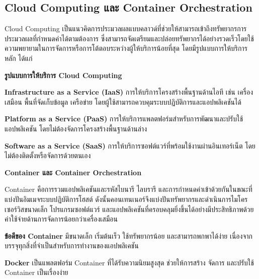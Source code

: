 \subsection{Cloud Computing และ Container Orchestration}

\hspace*{1.5em} %
Cloud Computing เป็นแนวคิดการประมวลผลแบบคลาวด์ที่ช่วยให้สามารถเข้าถึงทรัพยากรการประมวลผลที่กำหนดค่าได้ตามต้องการ ซึ่งสามารถจัดเตรียมและปล่อยทรัพยากรได้อย่างรวดเร็วโดยใช้ความพยายามในการจัดการหรือการโต้ตอบระหว่างผู้ให้บริการน้อยที่สุด โดยมีรูปแบบการให้บริการหลัก ได้แก่

\hspace*{1.5em} %
\textbf{รูปแบบการให้บริการ Cloud Computing}
\begin{mycustomitem}
    \item \textbf{Infrastructure as a Service (IaaS)} การให้บริการโครงสร้างพื้นฐานด้านไอที เช่น เครื่องเสมือน พื้นที่จัดเก็บข้อมูล เครือข่าย โดยผู้ใช้สามารถควบคุมระบบปฏิบัติการและแอปพลิเคชันได้
    \item \textbf{Platform as a Service (PaaS)} การให้บริการแพลตฟอร์มสำหรับการพัฒนาและปรับใช้แอปพลิเคชัน โดยไม่ต้องจัดการโครงสร้างพื้นฐานด้านล่าง
    \item \textbf{Software as a Service (SaaS)} การให้บริการซอฟต์แวร์ที่พร้อมใช้งานผ่านอินเทอร์เน็ต โดยไม่ต้องติดตั้งหรือจัดการด้วยตนเอง
\end{mycustomitem}

\hspace*{1.5em} %
\textbf{Container และ Container Orchestration}

\hspace*{1.5em} %
Container คือการรวมแอปพลิเคชันและรหัสไบนารี ไลบรารี และการกำหนดค่าเข้าด้วยกันในขณะที่แบ่งปันอิมเมจระบบปฏิบัติการโฮสต์ ดังนั้นคอนเทนเนอร์จึงแบ่งปันทรัพยากรและดำเนินการไมโครเซอร์วิสขนาดเล็ก โปรแกรมซอฟต์แวร์ และแอปพลิเคชันที่ครอบคลุมยิ่งขึ้นได้อย่างมีประสิทธิภาพด้วยค่าใช้จ่ายด้านการจัดการน้อยกว่าเครื่องเสมือน

\begin{mycustomitem}
    \item \textbf{ข้อดีของ Container} มีขนาดเล็ก เริ่มต้นเร็ว ใช้ทรัพยากรน้อย และสามารถพกพาได้ง่าย เนื่องจากบรรจุทุกสิ่งที่จำเป็นสำหรับการทำงานของแอปพลิเคชัน
    \item \textbf{Docker} เป็นแพลตฟอร์ม Container ที่ได้รับความนิยมสูงสุด ช่วยให้การสร้าง จัดการ และปรับใช้ Container เป็นเรื่องง่าย
\end{mycustomitem}

